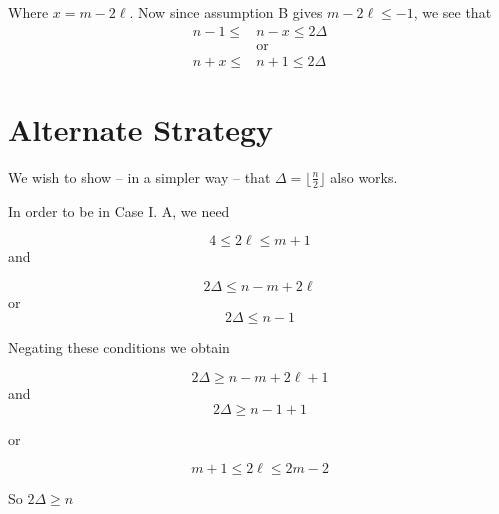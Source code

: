 \documentclass[letterpaper, 10pt]{article}
\begin{document}
Where $x = m -2\ell$. Now since assumption B gives $m - 2\ell \leq -1$, we
see that
\begin{align*}
 n-1 \leq & n-x \leq 2 \Delta \\
          & \text{or}         \\
 n+x \leq & n+1 \leq 2 \Delta
\end{align*}

\newpage
\section{Alternate Strategy}

We wish to show -- in a simpler way -- that $\Delta = \lfloor \frac{n}{2} \rfloor$
also works.

In order to be in Case I. A, we need

\[ 4 \leq 2 \ell \leq m+1 \]
and

\[ 2\Delta \leq n - m + 2\ell \]
or
\[ 2\Delta \leq n-1 \]

Negating these conditions we obtain

\[ 2\Delta \geq n - m + 2\ell +1 \]
and
\[ 2 \Delta \geq n - 1 + 1 \]

or

\[ m+1 \leq 2 \ell \leq 2m -2 \]

So $2\Delta \geq n$
\end{document}
